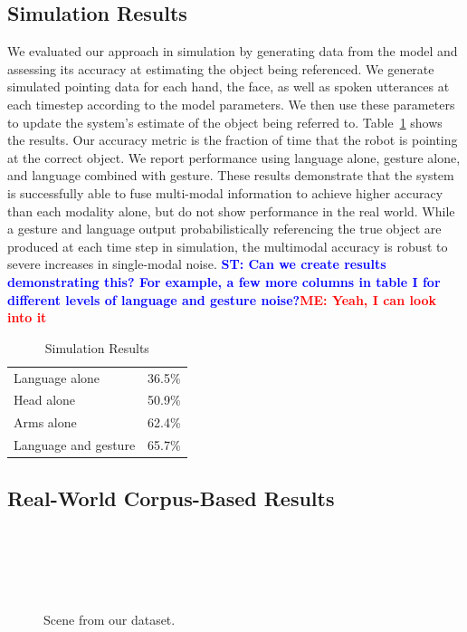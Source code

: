 \documentclass[letterpaper, 10 pt, conference]{ieeeconf}
\newcommand{\stnote}[1]{\textcolor{Blue}{\textbf{ST: #1}}}
\newcommand{\menote}[1]{\textcolor{Red}{\textbf{ME: #1}}}
\begin{document}
\subsection{Simulation Results}

We evaluated our approach in simulation by generating data from the
model and assessing its accuracy at estimating the object being
referenced.  We generate simulated pointing data for each hand, the
face, as well as spoken utterances at each timestep according to the
model parameters.  We then use these parameters to update the system's
estimate of the object being referred to.
Table~\ref{table:sim_results} shows the results.  Our accuracy metric
is the fraction of time that the robot is pointing at the correct
object.  We report performance using language alone, gesture alone,
and language combined with gesture.  These results demonstrate that
the system is successfully able to fuse multi-modal information to
achieve higher accuracy than each modality alone, but do not show
performance in the real world.  While a gesture and language output
probabilistically referencing the true object are produced at each
time step in simulation, the multimodal accuracy is robust to severe
increases in single-modal noise.  \stnote{Can we create results
  demonstrating this?  For example, a few more columns in table I for
  different levels of language and gesture noise?}\menote{Yeah, I can look into it}


\begin{table}
\centering
\caption{Simulation Results\label{table:sim_results}}
\begin{tabular}{lr}
Language alone &  36.5\%\\
Head alone & 50.9\%\\
Arms alone & 62.4\%\\
Language and gesture &  65.7\%
\end{tabular}

\end{table}

\subsection{Real-World Corpus-Based Results}

\begin{figure}
\parbox{1\linewidth}{~\\~\\~\\~\\}
\caption{Scene from our dataset.\label{fig:corpus_scene}}
\end{figure}
\end{document}
